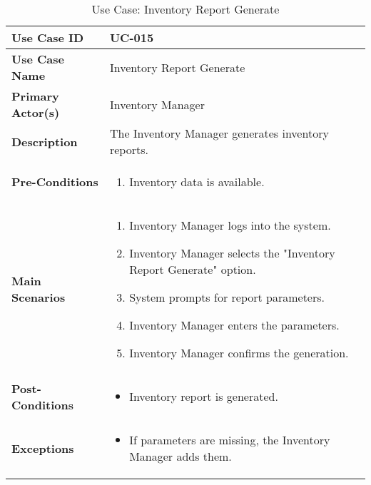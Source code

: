 \documentclass{article}
\begin{document}
\begin{table}[!ht]
    \centering
    \renewcommand{\arraystretch}{1.3}
    \begin{tabularx}{\textwidth}{|l|X|}
        \hline
        \textbf{Use Case ID} & UC-015 \\
        \hline
        \textbf{Use Case Name} & Inventory Report Generate \\
        \hline
        \textbf{Primary Actor(s)} & Inventory Manager \\
        \hline
        \textbf{Description} & The Inventory Manager generates inventory reports. \\
        \hline
        \textbf{Pre-Conditions} & 
        \begin{enumerate}[label=\arabic*.,itemsep=0pt]
            \item Inventory data is available.
        \end{enumerate} \\
        \hline
        \textbf{Main Scenarios} & 
        \begin{enumerate}[label=\arabic*.,itemsep=0pt]
            \item Inventory Manager logs into the system.
            \item Inventory Manager selects the "Inventory Report Generate" option.
            \item System prompts for report parameters.
            \item Inventory Manager enters the parameters.
            \item Inventory Manager confirms the generation.
        \end{enumerate} \\
        \hline
        \textbf{Post-Conditions} & 
        \begin{itemize}[label=--,itemsep=0pt]
            \item Inventory report is generated.
        \end{itemize} \\
        \hline
        \textbf{Exceptions} & 
        \begin{itemize}[label=--,itemsep=0pt]
            \item If parameters are missing, the Inventory Manager adds them.
        \end{itemize} \\
        \hline
    \end{tabularx}
    \caption{Use Case: Inventory Report Generate}
    \label{tab:use-case-inventory-report-generate}
\end{table}
\end{document}

